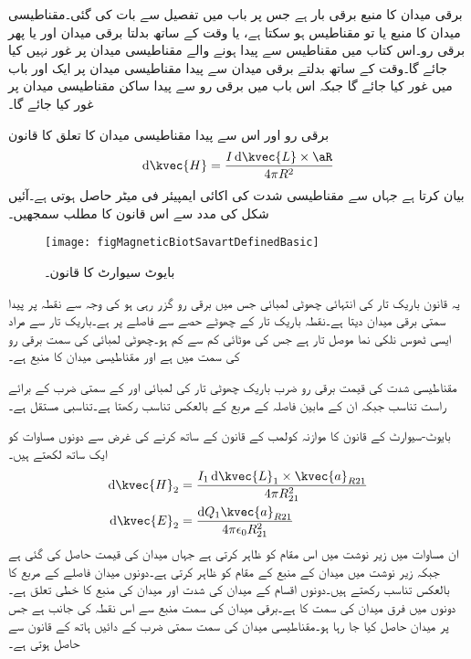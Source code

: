 برقی میدان کا منبع برقی بار ہے جس پر باب  میں تفصیل سے بات کی گئی۔مقناطیسی میدان کا منبع یا تو مقناطیس ہو سکتا ہے، یا وقت کے ساتھ بدلتا برقی میدان اور یا پھر برقی رو۔اس کتاب میں مقناطیس سے پیدا ہونے والے مقناطیسی میدان پر غور نہیں کیا جائے گا۔وقت کے ساتھ بدلتے برقی میدان سے پیدا مقناطیسی میدان پر ایک اور باب میں غور کیا جائے گا جبکہ اس باب میں برقی رو سے پیدا ساکن مقناطیسی میدان پر غور کیا جائے گا۔

برقی رو اور اس سے پیدا مقناطیسی میدان کا تعلق  کا قانون
\begin{align}\label{مساوات_بایوٹ_سیوارٹ_تفرق_شکل}
\dif \kvec{H}=\frac{I \dif \kvec{L} \times \aR}{4 \pi R^2}
\end{align}
 بیان کرتا ہے جہاں سے مقناطیسی شدت  کی اکائی ایمپیئر فی میٹر  حاصل ہوتی ہے۔آئیں شکل  کی مدد سے  اس قانون کا مطلب سمجھیں۔

\begin{figure}
\centering
\texttt{[image: figMagneticBiotSavartDefinedBasic]}
\caption{بایوٹ سیوارٹ کا قانون۔}
\label{شکل_مقناطیسی_بایوٹ_سیوارٹ_قانون}
\end{figure}
یہ قانون باریک تار کی انتہائی چھوٹی لمبائی  جس میں  برقی رو  گزر رہی ہو کی وجہ  سے  نقطہ  پر پیدا سمتی برقی میدان  دیتا ہے۔نقطہ  باریک تار کے چھوٹے حصے سے  فاصلے پر ہے۔باریک تار سے مراد ایسی ٹھوس نلکی نما موصل تار ہے جس کی موٹائی کم سے کم ہو۔چھوٹی لمبائی  کی سمت برقی رو کی سمت میں ہے اور   مقناطیسی میدان کا منبع ہے۔

مقناطیسی شدت کی قیمت برقی رو ضرب باریک چھوٹی تار کی لمبائی  اور  کے سمتی ضرب کے برائے راست تناسب جبکہ ان کے مابین فاصلہ  کے مربع کے بالعکس تناسب رکھتا ہے۔تناسبی مستقل  ہے۔

بایوٹ-سیوارٹ کے  قانون کا موازنہ کولمب کے قانون کے ساتھ کرنے کی غرض سے دونوں مساوات کو ایک ساتھ لکھتے ہیں۔
\begin{gather}
\begin{aligned}\label{مساوات_بایوٹ_سیوارٹ_تفرق_شکل_ب}
\dif \kvec{H}_2&=\frac{I_1 \dif \kvec{L}_1 \times \kvec{a}_{R21}}{4 \pi R_{21}^2}\\
\dif \kvec{E}_2&=\frac{\dif Q_1 \kvec{a}_{R21}}{4\pi \epsilon_0 R_{21}^2}
\end{aligned}
\end{gather}
ان مساوات میں زیر نوشت میں  اس مقام کو ظاہر کرتی ہے جہاں میدان کی قیمت حاصل کی گئی ہے جبکہ زیر نوشت میں  میدان کے منبع کے مقام کو ظاہر کرتی ہے۔دونوں میدان فاصلے کے مربع کا بالعکس تناسب رکھتے ہیں۔دونوں اقسام کے میدان کی شدت اور میدان کی منبع کا خطی تعلق ہے۔دونوں میں فرق میدان کی سمت کا ہے۔برقی میدان کی سمت منبع سے اس نقطہ کی جانب ہے جس پر میدان حاصل کیا جا رہا ہو۔مقناطیسی میدان کی سمت سمتی ضرب کے دائیں ہاتھ کے قانون سے حاصل ہوتی ہے۔

